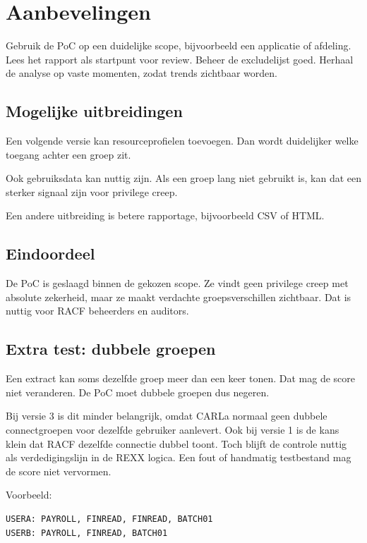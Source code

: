 \section{Aanbevelingen}

Gebruik de PoC op een duidelijke scope, bijvoorbeeld een applicatie of afdeling. Lees het rapport als startpunt voor review. Beheer de excludelijst goed. Herhaal de analyse op vaste momenten, zodat trends zichtbaar worden.

\subsection*{Mogelijke uitbreidingen}

Een volgende versie kan resourceprofielen toevoegen. Dan wordt duidelijker welke toegang achter een groep zit.

Ook gebruiksdata kan nuttig zijn. Als een groep lang niet gebruikt is, kan dat een sterker signaal zijn voor privilege creep.

Een andere uitbreiding is betere rapportage, bijvoorbeeld CSV of HTML.

\subsection*{Eindoordeel}

De PoC is geslaagd binnen de gekozen scope. Ze vindt geen privilege creep met absolute zekerheid, maar ze maakt verdachte groepsverschillen zichtbaar. Dat is nuttig voor RACF beheerders en auditors.

\subsection*{Extra test: dubbele groepen}

Een extract kan soms dezelfde groep meer dan een keer tonen. Dat mag de score niet veranderen. De PoC moet dubbele groepen dus negeren.

Bij versie 3 is dit minder belangrijk, omdat CARLa normaal geen dubbele connectgroepen voor dezelfde gebruiker aanlevert. Ook bij versie 1 is de kans klein dat RACF dezelfde connectie dubbel toont. Toch blijft de controle nuttig als verdedigingslijn in de REXX logica. Een fout of handmatig testbestand mag de score niet vervormen.

Voorbeeld:

\begin{verbatim}
USERA: PAYROLL, FINREAD, FINREAD, BATCH01
USERB: PAYROLL, FINREAD, BATCH01
\end{verbatim}

